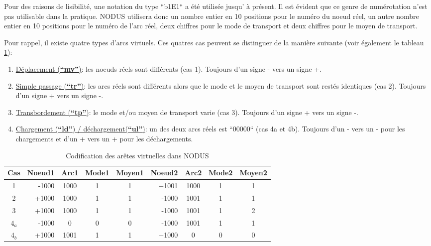 Pour des raisons de lisibilité, une notation du type ``b1E1`` a été utilisée
jusqu' à présent. Il est évident que ce genre de numérotation n'est pas
utilisable dans la pratique. NODUS utilisera donc un nombre entier en 10
positions pour le numéro du noeud réel, un autre nombre entier en 10 positions
pour le numéro de l'arc réel, deux chiffres pour le mode de transport et deux
chiffres pour le moyen de transport.

Pour rappel, il existe quatre types d'arcs virtuels. Ces quatres cas peuvent se
distinguer de la manière suivante (voir également le tableau \ref{tab3_8}):

\begin{enumerate}
\item \underline{Déplacement (\textbf{``mv''})}: les noeuds réels sont différents (cas 1). Toujours d'un signe - vers un signe +.
\item \underline{Simple passage (\textbf{``tr''})}: les arcs réels sont différents alors que
le mode et le moyen de transport sont restés identiques (cas 2). Toujours d'un signe + vers un signe -.
\item \underline{Transbordement (\textbf{``tp''})}: le mode et/ou moyen de transport varie (cas 3). Toujours d'un signe + vers un signe -.
\item \underline{Chargement (\textbf{``ld''}) / déchargement(\textbf{``ul''})}: un des deux arcs réels est
``00000`` (cas 4a et 4b). Toujours d'un - vers un - pour les chargements et d'un + vers un + pour les déchargements.
\end{enumerate}



\begin{table}[htbp]
\begin{center}
\begin{tabular}{crcccrccc}
\hline

Cas & Noeud1 & Arc1 & Mode1 & Moyen1 & Noeud2 & Arc2 & Mode2 & Moyen2\\
\hline
1 & -1000 & 1000 & 1 & 1 & +1001 & 1000 & 1 & 1\\

2 & +1000 & 1000 & 1 & 1 & -1000 & 1001 & 1 & 1\\

3 & +1000 & 1000 & 1 & 1 & -1000 & 1001 & 1 & 2\\

$4_a$ & -1000 & 0 & 0 & 0 & -1000 & 1001 & 1 & 1\\

$4_b$ & +1000 & 1001 & 1 & 1 & +1000 & 0 & 0 & 0\\
\hline
\end{tabular}
\caption{\label{tab3_8} Codification des ar\^etes virtuelles dans NODUS}
\end{center}
\end{table}


